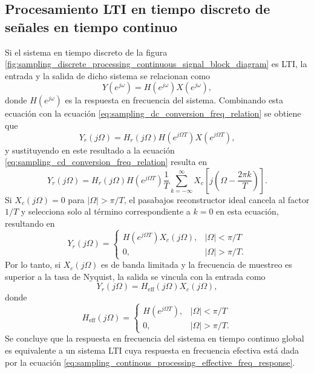 \documentclass[a4paper]{report}
\begin{document}
\subsection{Procesamiento LTI en tiempo discreto de señales en tiempo continuo}

Si el sistema en tiempo discreto de la figura \ref{fig:sampling_discrete_processing_continuous_signal_block_diagram} es LTI, la entrada y la salida de dicho sistema se relacionan como
\[
 Y(e^{j\omega})=H(e^{j\omega})X(e^{j\omega}),
\]
donde \(H(e^{j\omega})\) es la respuesta en frecuencia del sistema. Combinando esta ecuación con la ecuación \ref{eq:sampling_dc_conversion_freq_relation} se obtiene que 
\[
 Y_r(j\Omega)=H_r(j\Omega)H(e^{j\Omega T})X(e^{j\Omega T}),
\]
y sustituyendo en este resultado a la ecuación \ref{eq:sampling_cd_conversion_freq_relation} resulta en
\[
 Y_r(j\Omega)=H_r(j\Omega)H(e^{j\Omega T})\frac{1}{T}\sum_{k=-\infty}^{\infty}X_c\left[j\left(\Omega-\frac{2\pi k}{T}\right)\right].
\]
Si \(X_c(j\Omega)=0\) para \(|\Omega|>\pi/T\), el pasabajos reconstructor ideal cancela al factor \(1/T\) y selecciona solo al término correspondiente a \(k=0\) en esta ecuación, resultando en
\[
 Y_r(j\Omega)
 =\left\{
  \begin{array}{ll}
   H(e^{j\Omega T})X_c(j\Omega), & |\Omega|<\pi/T \\
   0, & |\Omega|>\pi/T.
  \end{array}
  \right.
\]
Por lo tanto, si \(X_c(j\Omega)\) es de banda limitada y la frecuencia de muestreo es superior a la tasa de Nyquist, la salida se vincula con la entrada como
\[
 Y_r(j\Omega)=H_\textrm{eff}(j\Omega)X_c(j\Omega),
\]
donde
\begin{equation}\label{eq:sampling_continous_processing_effective_freq_response}
 H_\textrm{eff}(j\Omega)
 =\left\{
  \begin{array}{ll}
   H(e^{j\Omega T}), & |\Omega|<\pi/T \\
   0, & |\Omega|>\pi/T.
  \end{array}
  \right. 
\end{equation}
Se concluye que la respuesta en frecuencia del sistema en tiempo continuo global es equivalente a un sistema LTI cuya respuesta en frecuencia efectiva está dada por la ecuación \ref{eq:sampling_continous_processing_effective_freq_response}.
\end{document}
